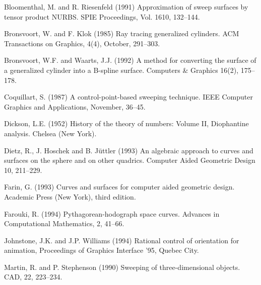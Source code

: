 \documentclass[times]{article}
\begin{document}


\begin{thebibliography}{Shoemake 85}

Bloomenthal, M. and R. Riesenfeld (1991)
Approximation of sweep surfaces by tensor product NURBS.
SPIE Proceedings,
Vol. 1610, 132--144.

Bronsvoort, W. and F. Klok (1985)
Ray tracing generalized cylinders.
ACM Transactions on Graphics, 4(4), October, 291--303.

Bronsvoort, W.F. and Waarts, J.J. (1992)
A method for converting the surface of a generalized cylinder into
a B-spline surface.
Computers \& Graphics 16(2), 175--178.

Coquillart, S. (1987)
A control-point-based sweeping technique.
IEEE Computer Graphics and Applications, November, 36--45.

Dickson, L.E. (1952) History of the theory of numbers: Volume II,
Diophantine analysis.  Chelsea (New York).

Dietz, R., J. Hoschek and B. J\"{u}ttler (1993)
An algebraic approach to curves and surfaces on the sphere and on other
quadrics.  Computer Aided Geometric Design 10, 211--229.

Farin, G. (1993) Curves and surfaces for computer aided geometric design.
Academic Press (New York), third edition.

Farouki, R. (1994)
Pythagorean-hodograph space curves.
Advances in Computational Mathematics, 2, 41--66.



Johnstone, J.K. and J.P. Williams (1994) Rational control of orientation
for animation, Proceedings of Graphics Interface '95, Quebec City.

Martin, R. and P. Stephenson (1990)
Sweeping of three-dimensional objects.
CAD, 22, 223--234.


\end{thebibliography}
\end{document}

